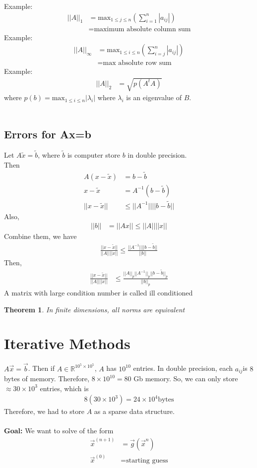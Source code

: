 \documentclass[11pt,oneside]{book}
\theoremstyle{break}
\theoremstyle{break}
\newtheorem{thm}{Theorem}[section]
\newcommand{\R}{\mathbb{R}}
\newcommand{\example}{\color{purple}Example: \color{black}}
\begin{document}
\example \begin{align*}
||A||_1&=\text{max}_{1\leq j\leq n}\left(\sum_{i=1}^n|a_{ij}| \right)\\
&=\text{maximum absolute column sum}
\end{align*}
\example \begin{align*}
||A||_{\infty}&=\text{max}_{1\leq i\leq n}\left(\sum_{i=j}^n|a_{ij}| \right)\\
&=\text{max absolute row sum}
\end{align*}
\example \begin{align*}
||A||_2&=\sqrt{p(A^tA)}
\end{align*}
where $p(b)=\text{max}_{1\leq i\leq n}|\lambda_i|$ where $\lambda_i$ is an eigenvalue of $B$.\\
\hfill\\
\subsection[Errors for Ax=b]{Errors for Ax=b}
Let $A\widetilde{x}=\widetilde{b}$, where $\widetilde{b}$ is computer store $b$ in double precision.\\
Then \begin{align*}
A(x-\widetilde{x})&=b-\widetilde{b}\\
x-\widetilde{x}&=A^{-1}(b-\widetilde{b})\\
||x-\widetilde{x}||&\leq ||A^{-1}||||b-\widetilde{b}||
\end{align*}
Also, \begin{align*}
||b||&=||Ax||\leq ||A||||x||
\end{align*}
Combine them, we have \begin{align*}
\frac{||x-\widetilde{x}||}{||A||||x||}\leq \frac{||A^{-1}||||b-\widetilde{b}||}{||b||}
\end{align*}
Then, \begin{align*}
\frac{||x-\widetilde{x}||}{||A||||x||}&\leq \frac{||A||_p||A^{-1}||_p||b-\widetilde{b}||_p}{||b||_p}
\end{align*}
A matrix with large condition number is called ill conditioned
\begin{thm}
In finite dimensions, all norms are equivalent
\end{thm}
\section[Iterative Methods]{Iterative Methods}
$A\vec{x}=\vec{b}$. Then if $A\in \R^{10^5\times 10^5}$, $A$ has $10^10$ entries. In double precision, each $a_{ij} $is $8$ bytes of memory. Therefore, $8\times 10^10=80$ Gb memory. So, we can only store $\approx 30\times 10^3$ entries, which is \begin{align*}
8(30\times 10^3)=24\times 10^4 \text{bytes}
\end{align*}
Therefore, we had to store $A$ as a sparse data structure.\\
\hfill\\
\textbf{Goal:} We want to solve of the form \begin{align*}
\vec{x}^{(n+1)}&=\vec{g}(\vec{x}^{n})\\
\vec{x}^(0)&=\text{starting guess}
\end{align*}
\end{document}
